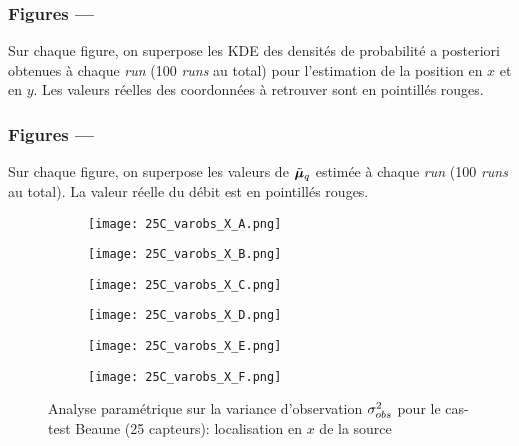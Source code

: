 \subsubsection*{Figures ---}

Sur chaque figure, on superpose les KDE des densités de probabilité a posteriori obtenues à chaque \textit{run} (100 \textit{runs} au total) pour l'estimation de la position en $x$ et en $y$. Les valeurs réelles des coordonnées à retrouver sont en pointillés rouges.

\subsubsection*{Figures ---}

Sur chaque figure, on superpose les valeurs de $\tilde{{\bm{\mu}}}_q$ estimée à chaque \textit{run} (100 \textit{runs} au total). La valeur réelle du débit est en pointillés rouges.
 
 
  \begin{figure}[p!]
  	\centering
  	\begin{subfigure}[t]{0.5\textwidth}
  		\centering
  		\texttt{[image: 25C\_varobs\_X\_A.png]}
  		\caption{}
  		\label{varA_x}
  	\end{subfigure}%
  	\begin{subfigure}[t]{0.5\textwidth}
  		\centering
  		\texttt{[image: 25C\_varobs\_X\_B.png]}
  		\caption{}
  		\label{varB_x}
  	\end{subfigure}
	  	\begin{subfigure}[t]{0.5\textwidth}
	  		\centering
	  		\texttt{[image: 25C\_varobs\_X\_C.png]}
	  		\caption{}
	  		\label{varC_x}
	  	\end{subfigure}%
	  	\begin{subfigure}[t]{0.5\textwidth}
	  		\centering
	  		\texttt{[image: 25C\_varobs\_X\_D.png]}
	  		\caption{}
	  		\label{varD_x}
	  	\end{subfigure}
	   	\begin{subfigure}[t]{0.5\textwidth}
	   		\centering
	   		\texttt{[image: 25C\_varobs\_X\_E.png]}
	   		\caption{}
	   		\label{varE_x}
	   	\end{subfigure}%
	   	\begin{subfigure}[t]{0.5\textwidth}
	   		\centering
	   		\texttt{[image: 25C\_varobs\_X\_F.png]}
	   		\caption{}
	   		\label{varF_x}
	   	\end{subfigure}
	   	\caption{Analyse paramétrique sur la variance d'observation ${\sigma_{obs}^2}$ pour le cas-test Beaune (25 capteurs): localisation en $x$ de la source}
	   	\label{fig_25C_analyse_varobs_x}

  \end{figure}
  
